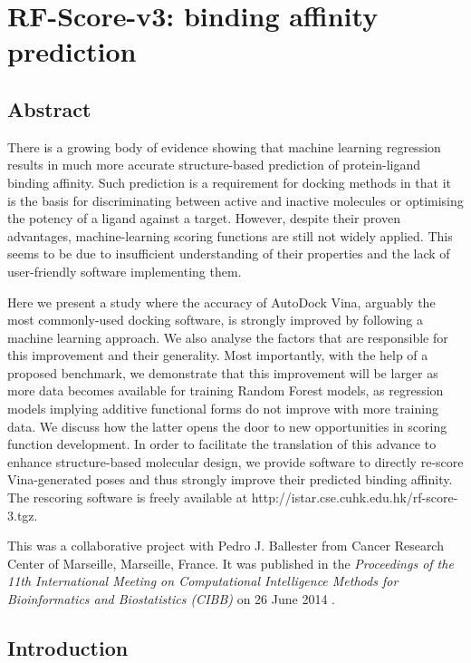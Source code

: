 \chapter{RF-Score-v3: binding affinity prediction}

\section{Abstract}

There is a growing body of evidence showing that machine learning regression results in much more accurate structure-based prediction of protein-ligand binding affinity. Such prediction is a requirement for docking methods in that it is the basis for discriminating between active and inactive molecules or optimising the potency of a ligand against a target. However, despite their proven advantages, machine-learning scoring functions are still not widely applied. This seems to be due to insufficient understanding of their properties and the lack of user-friendly software implementing them.

Here we present a study where the accuracy of AutoDock Vina, arguably the most commonly-used docking software, is strongly improved by following a machine learning approach. We also analyse the factors that are responsible for this improvement and their generality. Most importantly, with the help of a proposed benchmark, we demonstrate that this improvement will be larger as more data becomes available for training Random Forest models, as regression models implying additive functional forms do not improve with more training data. We discuss how the latter opens the door to new opportunities in scoring function development. In order to facilitate the translation of this advance to enhance structure-based molecular design, we provide software to directly re-score Vina-generated poses and thus strongly improve their predicted binding affinity. The rescoring software is freely available at http://istar.cse.cuhk.edu.hk/rf-score-3.tgz.

This was a collaborative project with Pedro J. Ballester from Cancer Research Center of Marseille, Marseille, France. It was published in the \textit{Proceedings of the 11th International Meeting on Computational Intelligence Methods for Bioinformatics and Biostatistics (CIBB)} on 26 June 2014 \citep{1433}.

\section{Introduction}

